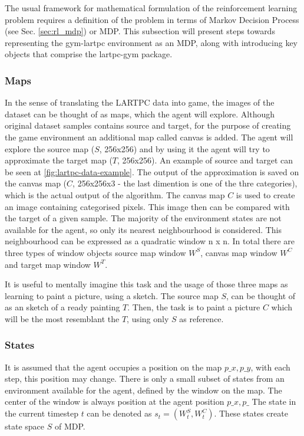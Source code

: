 The usual framework for mathematical formulation of the reinforcement learning problem requires a definition of the problem in terms of Markov Decision Process (see Sec. \ref{sec:rl_mdp}) or MDP.
This subsection will present steps towards representing the gym-lartpc environment as an MDP, along with introducing key objects that comprise the lartpc-gym package.

\subsubsection{Maps}

In the sense of translating the LARTPC data into game, the images of the dataset can be thought of as maps, which the agent will explore.
Although original dataset samples contains source and target, for the purpose of creating the game environment an additional map called canvas is added.
The agent will explore the source map ($S$, 256x256) and by using it the agent will try to approximate the target map ($T$, 256x256). An example of source and target can be seen at \ref{fig:lartpc-data-example}.
The output of the approximation is saved on the canvas map ($C$, 256x256x3 - the last dimention is one of the thre categories), which is the actual output of the algorithm.
The canvas map $C$ is used to create an image containing categorised pixels. 
This image then can be compared with the target of a given sample.
The majority of the environment states are not available for the agent, so only its nearest neighbourhood is considered.
This neighbourhood can be expressed as a quadratic window n x n.
In total there are three types of window objects source map window $W^{S}$, canvas map window $W^{C}$ and target map window $W^{T}$.

It is useful to mentally imagine this task and the usage of those three maps as learning to paint a picture, using a sketch.
The source map $S$, can be thought of as an sketch of a ready painting $T$. Then, the task is to paint a picture $C$ which will be the most resemblant the $T$, using only $S$ as reference.

\subsubsection{States}


It is assumed that the agent occupies a position on the map $p\_x,p\_y$, with each step, this position may change.
There is only a small subset of states from an environment available for the agent, defined by the window on the map.
The center of the window is always position at the agent position $p\_x,p\_$
The state in the current timestep $t$ can be denoted as $s_{t}=(W^{S}_{t}, W^{C}_{t})$. These states create state space $S$ of MDP.

